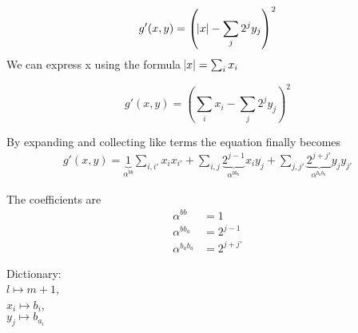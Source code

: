 \documentclass[english,notitlepage,longbibliography,showpacs,preprintnumbers,amsmath,amssymb,aps,prx,nofootinbib,12pt,superscriptaddress]{revtex4-1}
\begin{document}
\begin{equation}
  g'(x,y) = \left(\abs{x} - \sum_{j}2^jy_j\right)^2
\end{equation}
We can express x using the formula $\abs{x} = \sum_i x_i$

\begin{equation}
  g'(x,y) = \left(\sum_{i}x_i - \sum_{j}2^jy_j\right)^2
\end{equation}

\noindent By expanding and collecting like terms the equation finally becomes
\begin{equation}
\begin{split}
\left.
g'(x,y)
\right.
= \underbrace{1}_{\alpha^{bb}}\sum_{i,i'}x_i x_{i'}
+ \sum_{i,j}\underbrace{2^{j-1}}_{\alpha^{bb_a}} x_i y_j
+ \sum_{j,j'}\underbrace{2^{j+j'}}_{\alpha^{b_ab_a}}y_j y_{j'}
\end{split}
\end{equation}

\noindent The coefficients are
\begin{subequations}
\begin{align}
\alpha^{bb} &= 1\\
\alpha^{bb_a} &= 2^{j-1}\\
\alpha^{b_ab_a} &= 2^{j+j'}
\end{align}
\end{subequations}

\noindent Dictionary:\\
$l\mapsto m+1$,\\
$x_i\mapsto b_i$,\\
$y_j\mapsto b_{a_i}$\\


\end{document}

